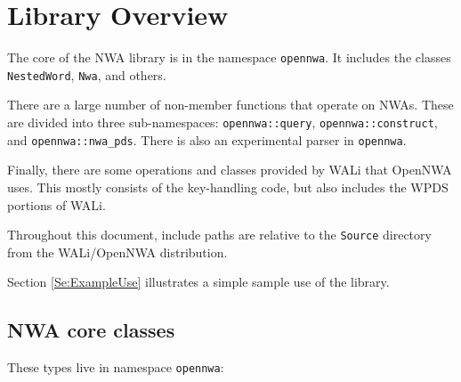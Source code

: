 \clearpage
\tableofcontents

\vspace{2\baselineskip}




\clearpage

\section{Library Overview}
\label{Se:Nested Word Automata}

The core of the NWA library is in the namespace \texttt{opennwa}. It
includes the classes \texttt{NestedWord}, \texttt{Nwa}, and others.

There are a large number of non-member functions that operate on NWAs. These
are divided into three sub-namespaces:
\texttt{opennwa::query}, \texttt{opennwa::construct}, and
\texttt{opennwa::nwa\_pds}. There is also an experimental parser in
\texttt{opennwa}.

Finally, there are some operations and classes provided by WALi that OpenNWA
uses. This mostly consists of the key-handling code,
but also includes the WPDS portions of WALi.

Throughout this document, include paths are relative to the \texttt{Source}
directory from the WALi/OpenNWA distribution.

Section \ref{Se:ExampleUse} illustrates a simple sample use of the library.

\subsection{NWA core classes}

These types live in namespace \texttt{opennwa}:

